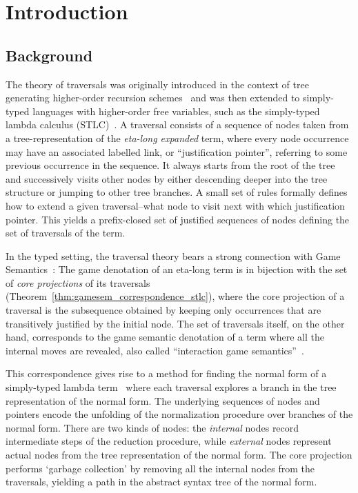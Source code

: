 \documentclass{elsarticle}
\theoremstyle{plain}
\theoremstyle{definition}
\begin{document}
\maketitle


\section{Introduction}

\subsection{Background}
The theory of traversals was originally introduced in the context of tree generating higher-order recursion schemes~\cite{OngLics2006} and was
then extended to simply-typed languages with higher-order free variables, such as the simply-typed lambda calculus (STLC)~\cite{BlumPhd}. A traversal consists of a sequence of nodes taken from a tree-representation of the \emph{eta-long expanded} term, where every node occurrence may have an associated labelled link, or ``justification pointer'', referring to some previous occurrence in the sequence. It always starts from the root of the tree and successively visits other nodes by either descending deeper into the tree structure or jumping to other tree branches. A small set of rules formally defines how to extend a given traversal--what node to visit next with which justification pointer. This yields a prefix-closed set of justified sequences of nodes defining the set of traversals of the term.

In the typed setting, the traversal theory bears a strong connection with Game Semantics~\cite{BlumPhd}: The game denotation of an eta-long term is in bijection with the set of \emph{core projections} of its traversals (Theorem~\ref{thm:gamesem_correspondence_stlc}), where the core projection of a traversal is the subsequence obtained by keeping only occurrences that are
transitively justified by the initial node.
The set of traversals itself, on the other hand, corresponds to the game semantic denotation of a term where all the internal moves are revealed, also called ``interaction game semantics''~\cite{BlumPhd}.

This correspondence gives rise to a method for finding the normal form of a simply-typed lambda term~\cite{BlumPhd,BlumGalop2008,Blum-LocalBeta2008}
where each traversal explores a branch in the tree representation of the normal form. The underlying sequences of nodes and pointers encode the unfolding of the normalization procedure over branches of the normal form. There are two kinds of nodes: the \emph{internal} nodes record intermediate steps of the reduction procedure, while \emph{external} nodes represent actual nodes from the tree representation of the normal form. The core projection performs
`garbage collection' by removing all the internal nodes from the traversals,  yielding a path in the abstract syntax tree of the normal form.
\end{document}

